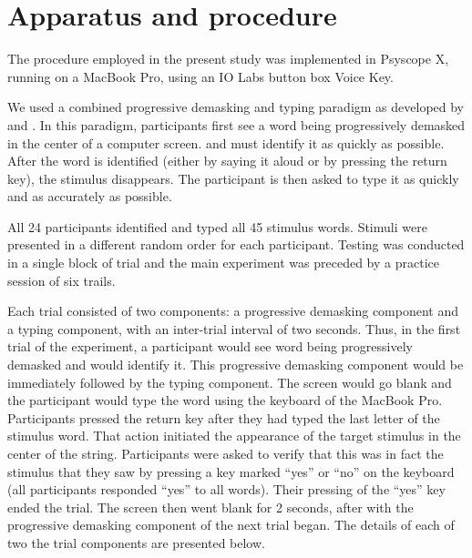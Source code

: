 \documentclass[output=paper]{langsci/langscibook}
\begin{document}
\section{Apparatus and procedure}\label{sec:libben:2.3}
The procedure employed in the present study was implemented in Psyscope X, running on a MacBook Pro, using an IO Labs button box Voice Key. 

We used a combined progressive demasking and typing paradigm as developed by \citet{LibbenEtAl2012} and \citet{LibbenWeber2014}. In this paradigm, participants first see a word being progressively demasked in the center of a computer screen. and must identify it as quickly as possible. After the word is identified (either by saying it aloud or by pressing the return key), the stimulus disappears. The participant is then asked to type it as quickly and as accurately as possible. 

All 24 participants identified and typed all 45 stimulus words. Stimuli were presented in a different random order for each participant.  Testing was conducted in a single block of trial and the main experiment was preceded by a practice session of six trails.

Each trial consisted of two components:  a progressive demasking component and a typing component, with an inter-trial interval of two seconds.  Thus, in the first trial of the experiment, a participant would see word being progressively demasked and would identify it. This progressive demasking component would be immediately followed by the typing component. The screen would go blank and the participant would type the word using the keyboard of the MacBook Pro. Participants pressed the return key after they had typed the last letter of the stimulus word. That action initiated the appearance of the target stimulus in the center of the string. Participants were asked to verify that this was in fact the stimulus that they saw by pressing a key marked “yes” or “no” on the keyboard (all participants responded “yes” to all words).  Their pressing of the “yes” key ended the trial. The screen then went blank for 2 seconds, after with the progressive demasking component of the next trial began.  The details of each of two the trial components are presented below.
\end{document}
